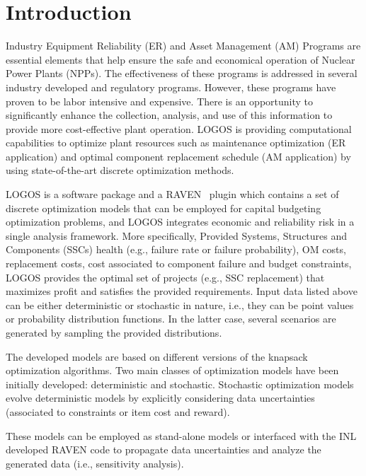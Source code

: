 \section{Introduction}
\label{sec:Introduction}

Industry Equipment Reliability (ER) and Asset Management (AM) Programs are essential elements that
help ensure the safe and economical operation of Nuclear Power Plants (NPPs). The effectiveness of
these programs is addressed in several industry developed and regulatory programs. However, these
programs have proven to be labor intensive and expensive. There is an opportunity to significantly
enhance the collection, analysis, and use of this information to provide more cost-effective plant
operation. LOGOS is providing computational capabilities to optimize plant resources such as
maintenance optimization (ER application) and optimal component replacement schedule (AM application)
by using state-of-the-art discrete optimization methods.

LOGOS is a software package and a RAVEN~\cite{RAVEN,RAVENtheoryMan} plugin which
contains a set of discrete optimization models that can be
employed for capital budgeting optimization problems, and LOGOS integrates economic and reliability
risk in a single analysis framework. More specifically,  Provided Systems, Structures and Components
(SSCs) health (e.g., failure rate or failure probability), OM costs, replacement costs, cost
associated to component failure and budget constraints, LOGOS provides the optimal set of projects
(e.g., SSC replacement) that maximizes profit and satisfies the provided requirements. Input data
listed above can be either deterministic or stochastic in nature, i.e., they can be point values
or probability distribution functions. In the latter case, several scenarios are generated by
sampling the provided distributions.

The developed models are based on different versions of the knapsack optimization algorithms.
Two main classes of optimization models have been initially developed: deterministic and stochastic.
Stochastic optimization models evolve deterministic models by explicitly considering data
uncertainties (associated to constraints or item cost and reward).

These models can be employed as stand-alone models or interfaced with the INL developed RAVEN code
to propagate data uncertainties and analyze the generated data (i.e., sensitivity analysis).

